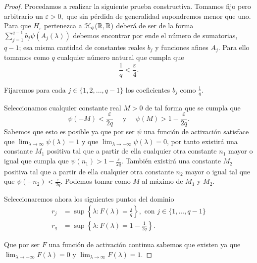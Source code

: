 \begin{proof}
    Procedamos a realizar la siguiente prueba constructiva. 
    Tomamos fijo pero arbitrario un $\varepsilon > 0,$ que sin pérdida de generalidad
    supondremos menor que uno.
    Para que $H_\varepsilon$ pertenezca a $\mathcal{H}_\psi{(\mathbb{R}, \mathbb{R})}$ deberá de ser de la 
    forma $\sum^{q-1}_{j=1} b_j \psi( A_j(\lambda))$
    debemos encontrar por ende el número de sumatorias, $q-1$; esa misma cantidad de constantes reales $b_j$ y 
    funciones afines $A_j$. Para ello tomamos como $q$ cualquier número natural que cumpla que 
    \begin{equation}\label{eq:lema_a_2_def_q}
        \frac{1}{q} < \frac{\varepsilon}{4}.
    \end{equation}

    Fijaremos para cada $j \in \{1,2, ...,q-1\}$ los coeficientes  $b_j$ como $\frac{1}{q}$. 

    Seleccionamos cualquier constante real $M>0$ de tal forma que 
    se cumpla que
    \begin{equation}\label{lema_a_2_psi_m}
        \psi(-M) < \frac{\varepsilon}{2q}
        \quad \text{ y } \quad
        \psi(M) > 1 - \frac{\varepsilon}{2q}.
    \end{equation} 
    Sabemos que esto es posible ya que por ser $\psi$ una función de activación satisface que 
    $\lim_{\lambda \longrightarrow \infty} \psi(\lambda) = 1$ y que  $\lim_{\lambda \longrightarrow -\infty} \psi(\lambda) = 0$,
    por tanto existirá una constante $M_1$ positiva tal que a partir de ella cualquier
     otra constante $n_1$ mayor o igual que cumpla que 
    $\psi(n_1) > 1 - \frac{\varepsilon}{2q}$. También existirá una constante $M_2$ positiva tal que a partir de 
    ella cualquier otra constante $n_2$ mayor o igual tal que que 
    $\psi(-n_2) < \frac{\varepsilon}{2q}$. Podemos tomar como $M$ al máximo de $M_1$ y $M_2$.   

    Seleccionaremos ahora los siguientes puntos del dominio
    \begin{align}\label{lema:2_2_selección_r_F}
        r_j &= \sup \left\{ \lambda: F(\lambda) = \frac{j}{q} \right\},
         \text{ con } j \in \{1, ..., q-1\} 
         \\
        r_q &= \sup \left\{ \lambda: F(\lambda) = 1 - \frac{1}{2 q} \right\}. 
    \end{align}

    Que por ser $F$ una función de activación continua 
    sabemos que existen
    ya que $\lim_{\lambda \longrightarrow - \infty} F(\lambda) = 0$ y 
    $\lim_{\lambda \longrightarrow  \infty} F(\lambda) = 1$. 


\end{proof}

